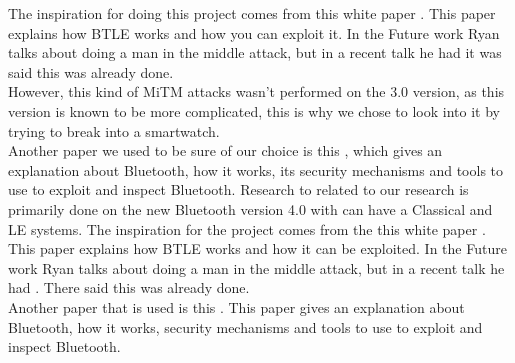 The inspiration for doing this project comes from this white paper \cite{mryan2014ble}. This paper explains how BTLE works and how you can exploit it. In the Future work Ryan talks about doing a man in the middle attack, but in a recent talk he had \cite{hitbox_mike_ryan} it was said this was already done. \\
However, this kind of MiTM attacks wasn't performed on the 3.0 version, as this version is known to be more complicated, this is why we chose to look into it by trying to break into a smartwatch.\\
Another paper we used to be sure of our choice is this \cite{chai20126}, which gives an explanation about Bluetooth, how it works, its security mechanisms and tools to use to exploit and inspect Bluetooth. 
Research to related to our research is primarily done on the new Bluetooth version 4.0 with can have a Classical and LE systems. The inspiration for the project comes from the this white paper \cite{mryan2014ble}. This paper explains how BTLE works and how it can be exploited. In the Future work Ryan talks about doing a man in the middle attack, but in a recent talk he had \cite{hitbox_mike_ryan}. There  said this was already done. \\ \indent Another paper that is used is this \cite{chai20126}. This paper gives an explanation about Bluetooth, how it works, security mechanisms and tools to use to exploit and inspect Bluetooth.
